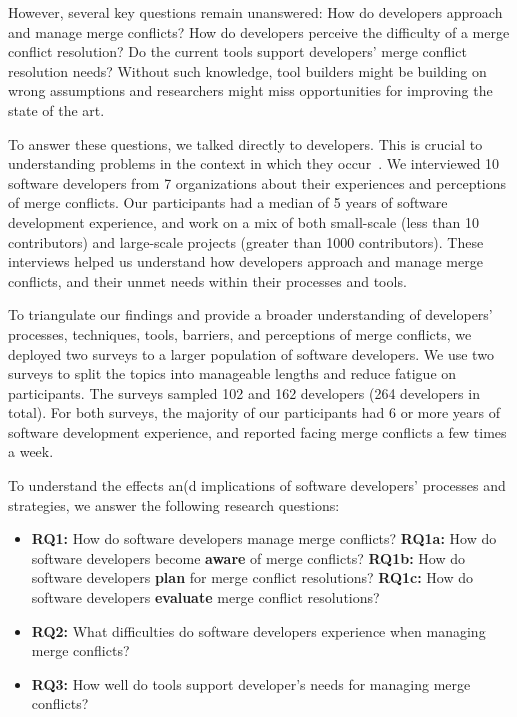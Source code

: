 However, several key questions remain unanswered: 
How do developers approach and manage merge conflicts?
How do developers perceive the difficulty of a merge conflict resolution? 
Do the current tools support developers' merge conflict resolution needs?
Without such knowledge, tool builders might be building on wrong assumptions and researchers might miss opportunities for improving the state of the art.

To answer these questions, we talked directly to developers.
This is crucial to understanding problems in the context in which they occur~\cite{fritz2010using, sillito2006questions, ko2007information}.
We interviewed 10 software developers from 7 organizations about their experiences and perceptions of merge conflicts. %
Our participants had a median of 5 years of software development experience, and work on a mix of both small-scale (less than 10 contributors) and large-scale projects (greater than 1000 contributors).
These interviews helped us understand how developers approach and manage merge conflicts, and their unmet needs within their processes and tools.

To triangulate our findings and provide a broader understanding of developers' processes, techniques, tools, barriers, and perceptions of merge conflicts, we deployed two surveys to a larger population of software developers.
We use two surveys to split the topics into manageable lengths and reduce fatigue on participants.
The surveys sampled 102 and 162 developers (264 developers in total).
For both surveys, the majority of our participants had 6 or more years of software development experience, and reported facing merge conflicts a few times a week.

To understand the effects an(d implications of software developers' processes and strategies, we answer the following research questions:

\begin{itemize}[label=$\bullet$]
\item \textbf{RQ1:} How do software developers manage merge conflicts?
\subitem \textbf{RQ1a:} How do software developers become \textbf{aware} of merge conflicts?
\subitem \textbf{RQ1b:} How do software developers \textbf{plan} for merge conflict resolutions?
\subitem \textbf{RQ1c:} How do software developers \textbf{evaluate} merge conflict resolutions?
\item \textbf{RQ2:} What difficulties do software developers experience when managing merge conflicts?
\item \textbf{RQ3:} How well do tools support developer's needs for managing merge conflicts?
\end{itemize}

